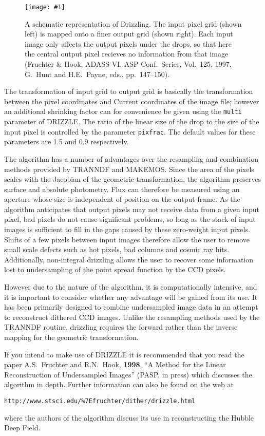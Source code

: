 \documentclass[twoside,11pt]{article}
\newcommand{\htmladdnormallink}[2]{#1}
\newcommand{\htmladdimg}[1]{}
\renewcommand{\_}{\texttt{\symbol{95}}}
\newcommand{\text}[1]{{\small \tt #1}}
\newcommand{\routine}[1]{{\sc #1}}
\newcommand{\myfig} [5] {
  \begin{figure}
    \centering\texttt{[image: \#1]}
    \typeout{#1 inserted on page \arabic{page}}
    \caption{\label{#4}#5}
  \end{figure}
  }
\newcommand{\myfig}[5]{
    \htmladdimg{#3}\\
    Figure: \label{#4} #5
    }
\begin{document}
\myfig{sun139driz.eps}{height=0.5\textheight}{driz.gif}{drizzlepicture}
{A schematic representation of Drizzling. The input pixel grid
(shown left) is mapped onto a finer output grid (shown right).
Each input image only affects the output pixels under the drops,
so that here the central output pixel recieves no information
from that image (Fruchter \& Hook, ADASS VI,
ASP Conf.\ Series, Vol.\ 125, 1997, G.~Hunt and H.E.~Payne, eds., pp.\
147--150).}

The transformation of input grid to output grid is basically the 
transformation between the pixel coordinates and Current coordinates
of the image file;
however an additional shrinking
factor can for convenience be given using the \text{multi} 
parameter of DRIZZLE.  The ratio of the linear size of the
drop to the size of the input pixel is controlled by the
parameter \text{pixfrac}.  The default values for these
parameters are 1.5 and 0.9 respectively.

The algorithm has a number of advantages over the resampling and
combination methods provided by \routine{TRANNDF} and \routine{MAKEMOS}.
Since the area of the
pixels scales with the Jacobian of the geometric transformation, the
algorithm preserves surface and absolute photometry. Flux can therefore
be measured using an aperture whose size is independent of position on
the output frame. As the algorithm anticipates that output pixels may not
receive data from a given input pixel, bad pixels do not cause significant
problems, so long as the stack of input images is sufficient to fill
in the gaps caused by these zero-weight input pixels. Shifts of a few
pixels between input images therefore allow the user to remove small scale
defects such as hot pixels, bad columns and cosmic ray hits. Additionally,
non-integral drizzling allows the user to recover some information lost
to undersampling of the point spread function by the CCD pixels.

However due to the nature of the algorithm, it is computationally
intensive, and it is important to consider whether any advantage will
be gained from its use. It has been primarily designed to combine
undersampled image data in an attempt to reconstruct dithered
CCD images.  Unlike the resampling methods used by the \routine{TRANNDF}
routine, drizzling requires the forward rather than the inverse
mapping for the geometric transformation.

If you intend to make use of \routine{DRIZZLE} it is
recommended that you read the paper 
A.S.~Fruchter and R.N.~Hook, {\bf 1998},
``A Method for the Linear Reconstruction of Undersampled Images''
(\htmladdnormallink{PASP, in
press}{http://xxx.soton.ac.uk/abs/astro-ph/9808087}) which discusses the
algorithm in depth. Further information can also be found on the web at
\htmladdnormallink{
{\tt http://www.stsci.edu/\%7Efruchter/dither/drizzle.html}
}{http://www.stsci.edu/~fruchter/dither/drizzle.html}
where the authors of the algorithm discuss its use in reconstructing
the Hubble Deep Field.
\end{document}
